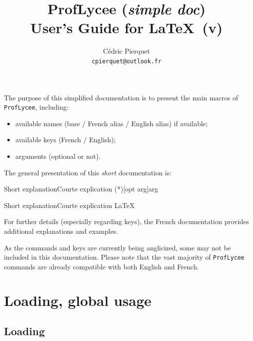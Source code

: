 \documentclass[a4paper,english,11pt]{article}
\date{\PLdate}
\title{ProfLycee (\textit{simple doc}) \\User’s Guide for \LaTeX\ (v\version)}
\author{Cédric Pierquet \\ \texttt{cpierquet@outlook.fr}}
\begin{document}
\maketitle

\bigskip

The purpose of this simplified documentation is to present the main macros of \texttt{ProfLycee}, including:

\begin{itemize}
  \item available names (base / French alias / English alias) if available;
  \item available keys (French / English);
  \item arguments (optional or not).
\end{itemize}

The general presentation of this \textit{short} documentation is:

\begin{myprestexcode}{Short explanation}{Courte explication}
\macro(*)[opt arg]{arg}

\end{myprestexcode}

\begin{myprestex}{Short explanation}{Courte explication}
\LaTeX
\end{myprestex}

For further details (especially regarding keys), the French documentation provides additional explanations and examples.

\smallskip

As the commands and keys are currently being anglicized, some may not be included in this documentation. Please note that the vast majority of \texttt{ProfLycee} commands are already compatible with both English and French.

\pagebreak

\tableofcontents

\pagebreak

\section{Loading, global usage}

\subsection{Loading}
\end{document}
